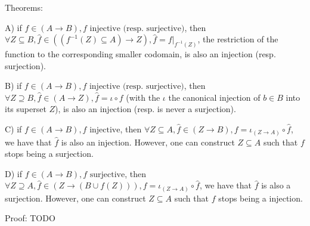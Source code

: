 \documentclass[12pt, letterpaper, twoside]{report}
\begin{document}
Theorems:

A) if $f \in (A \to B), f \text{ injective (resp. surjective)}$, then $\forall Z \subseteq B, \hat{f} \in ((f^{-1}(Z) \subseteq A) \to Z), \hat{f} = f|_{f^{-1}(Z)}$, the restriction of the function to the corresponding smaller codomain, is also an injection (resp. surjection).

B) if $f \in (A \to B), f \text{ injective (resp. surjective)}$, then $\forall Z \supseteq B, \hat{f} \in (A \to Z), \hat{f} = \iota \circ f$ (with the $\iota$ the canonical injection of $b \in B$ into its superset $Z$), is also an injection (resp. is never a surjection).

C) if $f \in (A \to B), f \text{ injective}$, then $\forall Z \subseteq A, \hat{f} \in (Z \to B), f = \iota_{(Z \to A)} \circ \hat{f}$, we have that $\hat{f}$ is also an injection. However, one can construct $Z \subseteq A$ such that $f$ stops being a surjection.

D) if $f \in (A \to B), f \text{ surjective}$, then $\forall Z \supseteq A, \hat{f} \in (Z \to (B \cup f(Z))), f = \iota_{(Z \to A)} \circ \hat{f}$, we have that $\hat{f}$ is also a surjection. However, one can construct $Z \subseteq A$ such that $f$ stops being a injection.

Proof: TODO

\newpage
\end{document}
